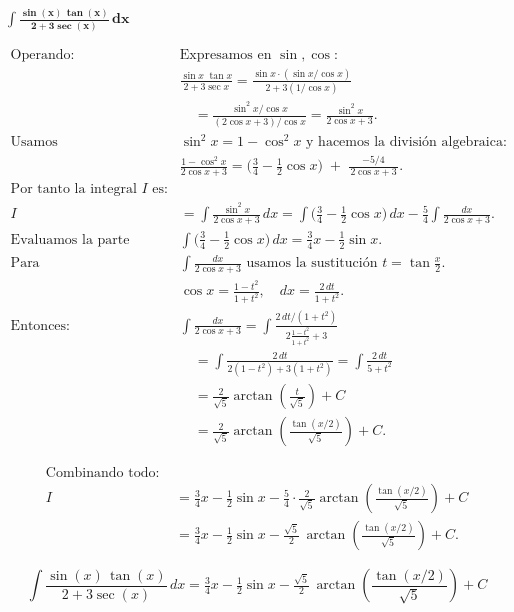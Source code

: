 $\displaystyle \mathbf{\int \frac{\sin(x)\,\tan(x)}{2+3\sec(x)}\,dx}$

\nopagebreak
$$
\begin{aligned}
\text{Operando: } &
\text{Expresamos en } \sin,\cos: \\[4pt]
&\frac{\sin x\;\tan x}{2+3\sec x}
= \frac{\sin x\cdot(\sin x/\cos x)}{2+3(1/\cos x)} \\[4pt]
&\quad= \frac{\sin^{2}x/\cos x}{(2\cos x+3)/\cos x}
= \frac{\sin^{2}x}{2\cos x+3}. \\[8pt]
\text{Usamos } &\sin^{2}x = 1-\cos^{2}x \text{ y hacemos la división algebraica:} \\[6pt]
&\frac{1-\cos^{2}x}{2\cos x+3}
= \Big(\tfrac{3}{4}-\tfrac{1}{2}\cos x\Big) \;+\; \frac{-5/4}{\,2\cos x+3\,}. \\[8pt]
\text{Por tanto la integral } I \text{ es:} \\[4pt]
I &= \int \frac{\sin^{2}x}{2\cos x+3}\,dx
= \int\Big(\tfrac{3}{4}-\tfrac{1}{2}\cos x\Big)\,dx
- \tfrac{5}{4}\int \frac{dx}{2\cos x+3}. \\[8pt]
\text{Evaluamos la parte elemental: } &
\int\Big(\tfrac{3}{4}-\tfrac{1}{2}\cos x\Big)\,dx
= \tfrac{3}{4}x - \tfrac{1}{2}\sin x. \\[8pt]
\text{Para } &\int \frac{dx}{2\cos x+3} \text{ usamos la sustitución } 
t=\tan\!\tfrac{x}{2}. \\[4pt]
&\cos x = \frac{1-t^{2}}{1+t^{2}}, \quad dx=\frac{2\,dt}{1+t^{2}}. \\[6pt]
\text{Entonces: } &
\int \frac{dx}{2\cos x+3}
= \int \frac{2\,dt/(1+t^{2})}{\,2\frac{1-t^{2}}{1+t^{2}}+3\,} \\[4pt]
&\quad= \int \frac{2\,dt}{2(1-t^{2})+3(1+t^{2})}
= \int \frac{2\,dt}{5+t^{2}} \\[6pt]
&\quad= \frac{2}{\sqrt{5}}\arctan\!\!\left(\frac{t}{\sqrt{5}}\right) + C \\[4pt]
&\quad= \frac{2}{\sqrt{5}}\arctan\!\!\left(\frac{\tan(x/2)}{\sqrt{5}}\right) + C.
\end{aligned}
$$

\nopagebreak
$$
\begin{aligned}
\text{Combinando todo: } \\
I &= \tfrac{3}{4}x - \tfrac{1}{2}\sin x
- \tfrac{5}{4}\cdot \frac{2}{\sqrt{5}}
\arctan\!\!\left(\frac{\tan(x/2)}{\sqrt{5}}\right) + C \\[6pt]
&= \tfrac{3}{4}x - \tfrac{1}{2}\sin x
- \tfrac{\sqrt{5}}{2}\,
\arctan\!\!\left(\frac{\tan(x/2)}{\sqrt{5}}\right) + C.
\end{aligned}
$$

$$
\boxed{\displaystyle 
\int \frac{\sin(x)\,\tan(x)}{2+3\sec(x)}\,dx
= \tfrac{3}{4}x - \tfrac{1}{2}\sin x
- \tfrac{\sqrt{5}}{2}\,
\arctan\!\!\left(\frac{\tan(x/2)}{\sqrt{5}}\right) + C}
$$
